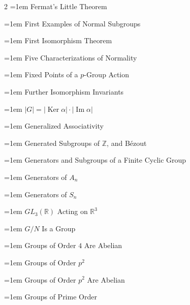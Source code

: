 \documentclass[11pt]{report}
\begin{document}
\begin{multicols}{2}
\noindent\hangindent=1em Fermat's Little Theorem\dotfill \pageref{cor:fermats-little-theorem}\par
\noindent\hangindent=1em First Examples of Normal Subgroups\dotfill \pageref{prop:first-examples-normal-subgroups}\par
\noindent\hangindent=1em First Isomorphism Theorem\dotfill \pageref{thm:first-isomorphism-theorem}\par
\noindent\hangindent=1em Five Characterizations of Normality\dotfill \pageref{thm:five-characterizations-normality}\par
\noindent\hangindent=1em Fixed Points of a $p$-Group Action\dotfill \pageref{prop:p-group-fixed-point}\par
\noindent\hangindent=1em Further Isomorphism Invariants\dotfill \pageref{prop:further-isomorphism-invariants}\par
\noindent\hangindent=1em $|G| = |\operatorname{Ker}\alpha| \cdot |\operatorname{Im}\alpha|$\dotfill \pageref{cor:g-ker-alpha-im-alpha}\par
\noindent\hangindent=1em Generalized Associativity\dotfill \pageref{prop:generalized-associativity}\par
\noindent\hangindent=1em Generated Subgroups of $\mathbb{Z}$, and B\'ezout\dotfill \pageref{cor:generated-subgroups-z-bezout}\par
\noindent\hangindent=1em Generators and Subgroups of a Finite Cyclic Group\dotfill \pageref{cor:generators-subgroups-finite-cyclic-group}\par
\noindent\hangindent=1em Generators of $A_n$\dotfill \pageref{thm:generators-an}\par
\noindent\hangindent=1em Generators of $S_n$\dotfill \pageref{thm:generators-sn}\par
\noindent\hangindent=1em $GL_3(\mathbb{R})$ Acting on $\mathbb{R}^3$\dotfill \pageref{prop:gl3-r-acting-r3}\par
\noindent\hangindent=1em $G/N$ Is a Group\dotfill \pageref{thm:g-n-group}\par
\noindent\hangindent=1em Groups of Order $4$ Are Abelian\dotfill \pageref{prop:groups-order-4-abelian}\par
\noindent\hangindent=1em Groups of Order $p^2$\dotfill \pageref{thm:groups-order-p-squared}\par
\noindent\hangindent=1em Groups of Order $p^2$ Are Abelian\dotfill \pageref{cor:order-p-squared-abelian}\par
\noindent\hangindent=1em Groups of Prime Order\dotfill \pageref{thm:groups-prime-order}\par

\end{multicols}
\end{document}
